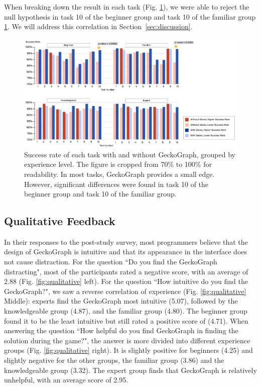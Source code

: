When breaking down the result in each task (Fig. \ref{fig:success-rate}), we were able to reject the null hypothesis in task 10 of the beginner group and task 10 of the familiar group \ref{fig:success-rate}. We will address this correlation in Section~\ref{sec:discussion}.


\begin{figure}[hbt]
  \includegraphics[width=\linewidth]{figures/SuccessfulRate}
  \caption[Success rate of each task with and without GeckoGraph, grouped by experience level]{\label{fig:success-rate}Success rate of each task with and without GeckoGraph, grouped by experience level. The figure is cropped from 70\% to 100\% for readability. In most tasks, GeckoGraph provides a small edge. However, significant differences were found in task 10 of the beginner group and task 10 of the familiar group. }
\end{figure}

\subsection{Qualitative Feedback}
In their responses to the post-study survey, most programmers believe that the design of GeckoGraph is intuitive and that its appearance in the interface does not cause distraction.
For the question ``Do you find the GeckoGraph distracting", most of the participants rated a negative score, with an average of 2.88 (Fig. \ref{fig:qualitative} left). For the question ``How intuitive do you find the GeckoGraph?", we saw a reverse correlation of experience (Fig. \ref{fig:qualitative} Middle): experts find the GeckoGraph most intuitive (5.07), followed by the knowledgeable group (4.87), and the familiar group (4.80). The beginner group found it to be the least intuitive but still rated a positive score of (4.71). 
 When answering the question ``How helpful do you find GeckoGraph in finding the solution during the game?", the answer is more divided into different experience groups (Fig. \ref{fig:qualitative} right). It is slightly positive for beginners (4.25) and slightly negative for the other groups, the familiar group (3.86) and the knowledgeable group (3.32). The expert group finds that GeckoGraph is relatively unhelpful, with an average score of 2.95.



